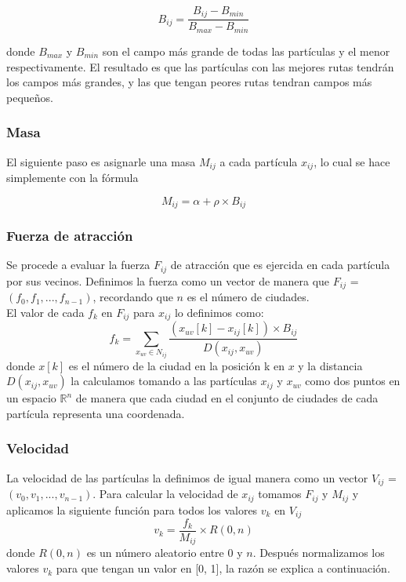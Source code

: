 \documentclass[12pt]{article}
\begin{document}
\begin{equation}
  B_{ij} = \frac{B_{ij} - B_{min}} {B_{max} - B_{min}} 
\end{equation}

\noindent donde $B_{max}$ y $B_{min}$ son el campo más grande de todas las partículas y el menor respectivamente. El resultado es que las partículas con las mejores rutas tendrán los campos más grandes, y las que tengan peores rutas tendran campos más pequeños.

\subsubsection*{Masa}
El siguiente paso es asignarle una masa $M_{ij}$ a cada partícula $x_{ij}$, lo cual se hace simplemente con la fórmula

\begin{equation}
  M_{ij} = \alpha + \rho \times B_{ij}
\end{equation}

\subsubsection*{Fuerza de atracción}
Se procede a evaluar la fuerza $F_{ij}$ de atracción que es ejercida en cada partícula por sus vecinos. Definimos la fuerza como un vector de manera que $F_{ij}$ = $(f_0, f_1, ... , f_{n - 1})$,  recordando que $n$ es el número de ciudades. \\
El valor de cada $f_k$ en $F_{ij}$ para $x_{ij}$ lo definimos como:
\begin{equation}
  f_k = \sum_{x_{uv} \in N_{ij}}\frac{(x_{uv}[k] - x_{ij}[k]) \times B_{ij}}{D(x_{ij}, x_{uv})}
\end{equation}
donde $x[k]$ es el número de la ciudad en la posición k en $x$ y la distancia $D(x_{ij}, x_{uv})$ la calculamos tomando a las partículas $x_{ij}$ y $x_{uv}$ como dos puntos en un espacio $\mathbb{R}^n$ de manera que cada ciudad en el conjunto de ciudades de cada partícula representa una coordenada.

\subsubsection*{Velocidad}\label{sec:vel}
La velocidad de las partículas la definimos de igual manera como un vector $V_{ij}$ = $(v_0, v_1,...,v_{n - 1})$. Para calcular la velocidad de $x_{ij}$ tomamos $F_{ij}$ y $M_{ij}$ y aplicamos la siguiente función para todos los valores $v_k$ en $V_{ij}$
\begin{equation}
  v_k = \frac{f_k}{M_{ij}} \times R(0, n)
\end{equation}
donde $R(0, n)$ es un número aleatorio entre 0 y $n$. Después normalizamos los valores $v_k$ para que tengan un valor en [0, 1], la razón se explica a continuación.
\end{document}

